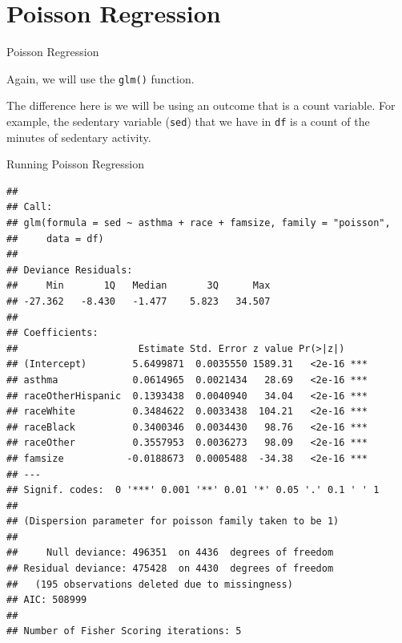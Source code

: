 \section{Poisson Regression}\label{poisson-regression}

\begin{frame}[fragile]{Poisson Regression}

Again, we will use the \texttt{glm()} function.

The difference here is we will be using an outcome that is a count
variable. For example, the sedentary variable (\texttt{sed}) that we
have in \texttt{df} is a count of the minutes of sedentary activity.

\end{frame}

\begin{frame}[fragile]{Running Poisson Regression}

\tiny

\begin{Shaded}
\begin{Highlighting}[]
\StringTok{ }\OperatorTok{~}\StringTok{ }\OperatorTok{+}\StringTok{ }\OperatorTok{+}\StringTok{ }
              \NormalTok{)}
\end{Highlighting}
\end{Shaded}

\begin{verbatim}
## 
## Call:
## glm(formula = sed ~ asthma + race + famsize, family = "poisson", 
##     data = df)
## 
## Deviance Residuals: 
##     Min       1Q   Median       3Q      Max  
## -27.362   -8.430   -1.477    5.823   34.507  
## 
## Coefficients:
##                     Estimate Std. Error z value Pr(>|z|)    
## (Intercept)        5.6499871  0.0035550 1589.31   <2e-16 ***
## asthma             0.0614965  0.0021434   28.69   <2e-16 ***
## raceOtherHispanic  0.1393438  0.0040940   34.04   <2e-16 ***
## raceWhite          0.3484622  0.0033438  104.21   <2e-16 ***
## raceBlack          0.3400346  0.0034430   98.76   <2e-16 ***
## raceOther          0.3557953  0.0036273   98.09   <2e-16 ***
## famsize           -0.0188673  0.0005488  -34.38   <2e-16 ***
## ---
## Signif. codes:  0 '***' 0.001 '**' 0.01 '*' 0.05 '.' 0.1 ' ' 1
## 
## (Dispersion parameter for poisson family taken to be 1)
## 
##     Null deviance: 496351  on 4436  degrees of freedom
## Residual deviance: 475428  on 4430  degrees of freedom
##   (195 observations deleted due to missingness)
## AIC: 508999
## 
## Number of Fisher Scoring iterations: 5
\end{verbatim}

\normalsize

\end{frame}

